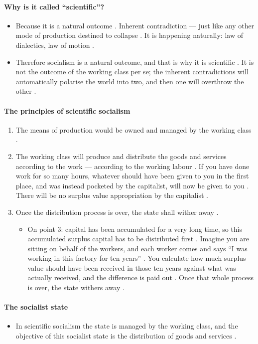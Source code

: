\paragraph{Why is it called ``scientific''?}
\begin{itemize}
    \item Because it is a natural outcome . Inherent contradiction --- just like any other mode of production destined to collapse . It is happening naturally: law of dialectics, law of motion .
    \item Therefore socialism is a natural outcome, and that is why it is scientific . It is not the outcome of the working class per se; the inherent contradictions will automatically polarise the world into two, and then one will overthrow the other .
\end{itemize}

\paragraph{The principles of scientific socialism}
\begin{enumerate}
    \item The means of production would be owned and managed by the working class .
    \item The working class will produce and distribute the goods and services according to the work --- according to the working labour . If you have done work for so many hours, whatever should have been given to you in the first place, and was instead pocketed by the capitalist, will now be given to you . There will be no surplus value appropriation by the capitalist .
    \item Once the distribution process is over, the state shall wither away .
    \begin{itemize}
        \item On point 3: capital has been accumulated for a very long time, so this accumulated surplus capital has to be distributed first . Imagine you are sitting on behalf of the workers, and each worker comes and says ``I was working in this factory for ten years'' . You calculate how much surplus value should have been received in those ten years against what was actually received, and the difference is paid out . Once that whole process is over, the state withers away .
    \end{itemize}
\end{enumerate}

\paragraph{The socialist state}
\begin{itemize}
    \item In scientific socialism the state is managed by the working class, and the objective of this socialist state is the distribution of goods and services .
\end{itemize}

